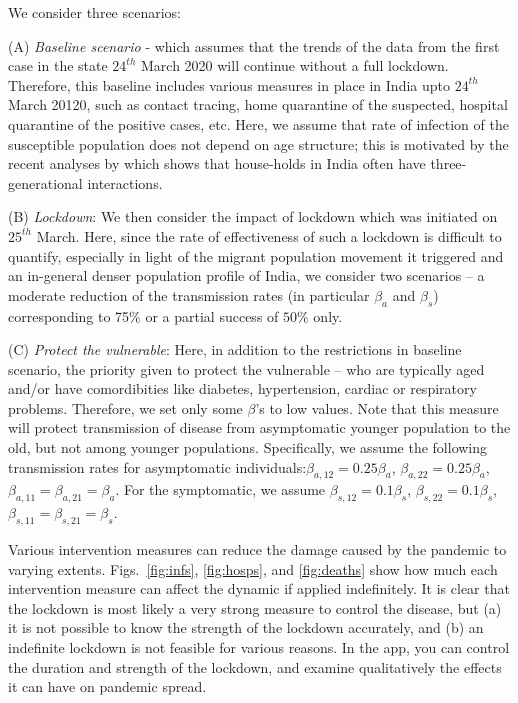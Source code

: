 \documentclass{article}
\begin{document}
We consider three scenarios: 

(A) {\it Baseline scenario} - which assumes that the trends of the data from the first case in the state $24^{th}$ March 2020 will continue without a full lockdown. Therefore, this baseline includes various measures in place in India upto $24^{th}$ March 20120, such as contact tracing, home quarantine of the suspected, hospital quarantine of the positive cases, etc. Here, we assume that rate of infection of the susceptible population does not depend on age structure; this is motivated by the recent analyses by \cite{singh2020} which shows that house-holds in India often have three-generational interactions.

(B) {\it Lockdown}: We then consider the impact of lockdown which was initiated on $25^{th}$ March. Here, since the rate of effectiveness of such a lockdown is difficult to quantify, especially in light of the migrant population movement it triggered and an in-general denser population profile of India,  we consider two scenarios -- a moderate reduction of the transmission rates (in particular $\beta_a$ and $\beta_s$) corresponding to 75\% or a partial success of $50\%$ only.

(C) {\it Protect the vulnerable}: Here, in addition to the restrictions in baseline scenario, the priority given to protect the vulnerable -- who are typically aged and/or have comordibities like diabetes, hypertension, cardiac or respiratory problems. Therefore, we set only some $\beta$'s to low values. Note that this measure will protect transmission of disease from asymptomatic younger population to the old, but not among younger populations. Specifically, we assume the following transmission rates for asymptomatic individuals:$\beta_{a,12} = 0.25 \beta_a$, $\beta_{a,22}=0.25 \beta_a$, $\beta_{a,11} = \beta_{a,21} = \beta_a$. For the symptomatic, we assume $\beta_{s,12} = 0.1 \beta_s$, $\beta_{s,22}=0.1 \beta_s$, $\beta_{s,11} = \beta_{s,21} = \beta_s$. 

Various intervention measures can reduce the damage caused by the pandemic to varying extents.
Figs.\ \ref{fig:infs}, \ref{fig:hosps}, and \ref{fig:deaths}  show how much each intervention measure can affect the dynamic if applied indefinitely.
It is clear that the lockdown is most likely a very strong measure to control the disease,
but (a) it is not possible to know the strength of the lockdown accurately, and (b) an indefinite
lockdown is not feasible for various reasons. In the app, you can control the duration and strength of the lockdown, and 
examine qualitatively the effects it can have on pandemic spread.
\end{document}
